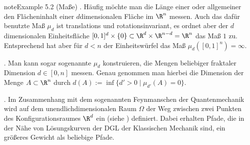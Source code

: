 \documentclass[letterpaper,10pt,english]{jupyterBook}
\begin{document}
\begin{sphinxadmonition}{note}{Example 5.2 (Maße)}
. Häufig möchte man die Länge einer  oder allgemeiner den Flächeninhalt einer \(d\)\sphinxhyphen{}dimensionalen Fläche im \(\R^n\) messen.
Auch das dafür benutzte Maß \(\mu_d\) ist translations\sphinxhyphen{} und rotationsinvariant, es ordnet aber der \(d\)\sphinxhyphen{}dimensionalen Einheitsfläche \([0,1]^d\times\{0\} \subset\R^d\times\R^{n-d}=\R^n\) das Maß \(1\) zu.
Entsprechend hat aber für \(d<n\) der Einheitswürfel das Maß \(\mu_d([0,1]^n)=\infty\).

. Man kann sogar sogenannte  \(\mu_d\) konstruieren, die Mengen beliebiger fraktaler Dimension \(d\in[0,n]\) messen.
Genau genommen  man hierbei die Dimension der Menge \(A\subset \R^n\) durch \(d(A):=\inf\{d'>0\mid \mu_{d'}(A)=0\}.\)

. Im Zusammenhang mit dem sogenannten Feynmanschen  der Quantenmechanik wird auf dem unendlich\sphinxhyphen{}dimensionalen Raum \(\Omega\) der Weg zwischen zwei Punkten des Konfigurationsraumes \(\R^d\) ein  (siehe {\hyperref[\detokenize{masstheorie/masstheorie:rem:wahrscheinlichkeitsmass}]{}}) definiert.
Dabei erhalten Pfade, die in der Nähe von Lösungskurven der DGL der Klassischen Mechanik sind, ein größeres Gewicht als beliebige Pfade.
\end{sphinxadmonition}
\end{document}
